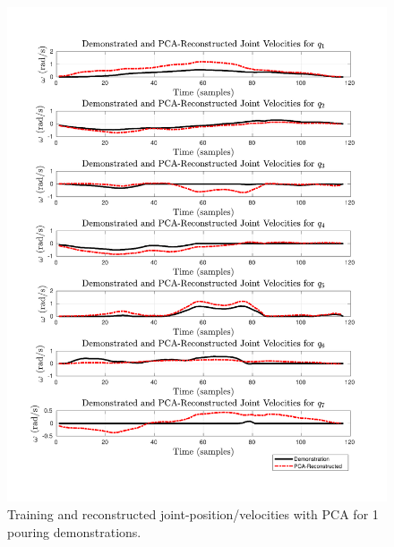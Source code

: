 \documentclass{article}
\begin{document}
\begin{enumerate}
\begin{figure}[!th]
\begin{minipage}{0.5\textwidth}
       	\includegraphics[trim={1.2cm 1.6cm 1.7cm 1.6cm},clip,width=\linewidth]{../../src/JTDS_mat_lib/figures/pca_vel_pour1.pdf}
    \end{minipage}
   \caption{Training and reconstructed joint-position/velocities with PCA for 1 pouring demonstrations. \label{fig:pca_velocities}}
\end{figure}


\end{enumerate}
\end{document}
